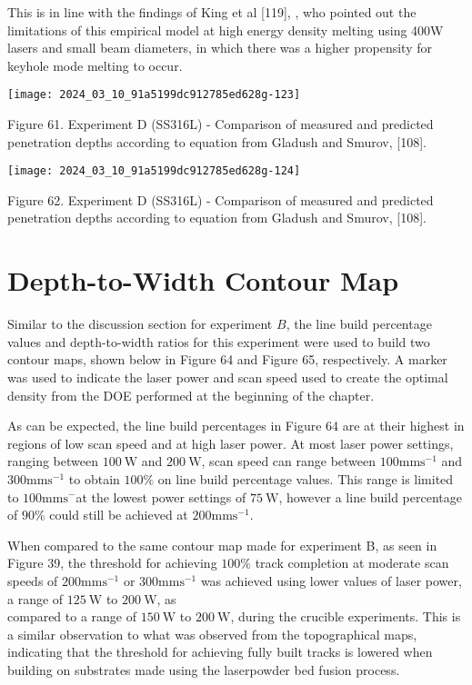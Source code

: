 \documentclass[10pt]{article}
\begin{document}
This is in line with the findings of King et al [119], , who pointed out the limitations of this empirical model at high energy density melting using 400W lasers and small beam diameters, in which there was a higher propensity for keyhole mode melting to occur.

\begin{center}
\texttt{[image: 2024\_03\_10\_91a5199dc912785ed628g-123]}
\end{center}

Figure 61. Experiment D (SS316L) - Comparison of measured and predicted penetration depths according to equation from Gladush and Smurov, [108].

\begin{center}
\texttt{[image: 2024\_03\_10\_91a5199dc912785ed628g-124]}
\end{center}

Figure 62. Experiment D (SS316L) - Comparison of measured and predicted penetration depths according to equation from Gladush and Smurov, [108].

\section*{Depth-to-Width Contour Map}
Similar to the discussion section for experiment $B$, the line build percentage values and depth-to-width ratios for this experiment were used to build two contour maps, shown below in Figure 64 and Figure 65, respectively. A marker was used to indicate the laser power and scan speed used to create the optimal density from the DOE performed at the beginning of the chapter.

As can be expected, the line build percentages in Figure 64 are at their highest in regions of low scan speed and at high laser power. At most laser power settings, ranging between $100 \mathrm{~W}$ and $200 \mathrm{~W}$, scan speed can range between $100 \mathrm{mms}^{-1}$ and $300 \mathrm{mms}^{-1}$ to obtain $100 \%$ on line build percentage values. This range is limited to $100 \mathrm{mms}^{-}$at the lowest power settings of $75 \mathrm{~W}$, however a line build percentage of $90 \%$ could still be achieved at $200 \mathrm{mms}^{-1}$.

When compared to the same contour map made for experiment B, as seen in Figure 39, the threshold for achieving $100 \%$ track completion at moderate scan speeds of $200 \mathrm{mms}^{-1}$ or $300 \mathrm{mms}^{-1}$ was achieved using lower values of laser power, a range of $125 \mathrm{~W}$ to $200 \mathrm{~W}$, as\\
compared to a range of $150 \mathrm{~W}$ to $200 \mathrm{~W}$, during the crucible experiments. This is a similar observation to what was observed from the topographical maps, indicating that the threshold for achieving fully built tracks is lowered when building on substrates made using the laserpowder bed fusion process.
\end{document}
